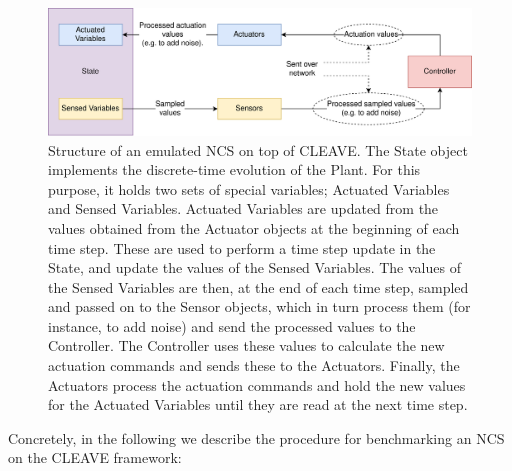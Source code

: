 \begin{figure}
    \centering
    \includegraphics[width=\textwidth]{images/CLEAVE_NCS_structure.png}
    \caption{
        Structure of an emulated NCS on top of CLEAVE.
        The State object implements the discrete-time evolution of the Plant.
        For this purpose, it holds two sets of special variables; Actuated Variables and Sensed Variables.
        Actuated Variables are updated from the values obtained from the Actuator objects at the beginning of each time step.
        These are used to perform a time step update in the State, and update the values of the Sensed Variables.
        The values of the Sensed Variables are then, at the end of each time step, sampled and passed on to the Sensor objects, which in turn process them (for instance, to add noise) and send the processed values to the Controller.
        The Controller uses these values to calculate the new actuation commands and sends these to the Actuators.
        Finally, the Actuators process the actuation commands and hold the new values for the Actuated Variables until they are read at the next time step.
    }
\end{figure}

Concretely, in the following we describe the procedure for benchmarking an NCS on the CLEAVE framework:

